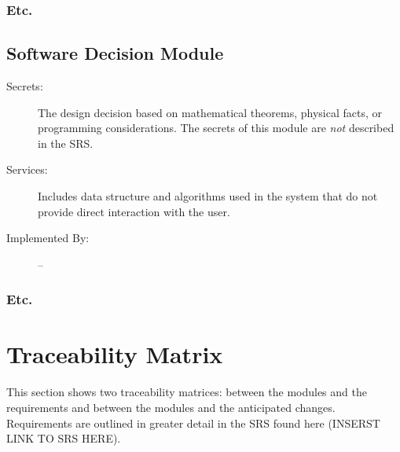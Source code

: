\documentclass[12pt, titlepage]{article}
\begin{document}
\subsubsection{Etc.}


\subsection{Software Decision Module}

\begin{description}
\item[Secrets:] The design decision based on mathematical theorems, physical
  facts, or programming considerations. The secrets of this module are
  \emph{not} described in the SRS.
\item[Services:] Includes data structure and algorithms used in the system that
  do not provide direct interaction with the user. 
\item[Implemented By:] --
\end{description}

\subsubsection{Etc.}

\section{Traceability Matrix} \label{SecTM}

This section shows two traceability matrices: between the modules and the
requirements and between the modules and the anticipated changes. Requirements are outlined in greater detail in the SRS found here (INSERST LINK TO SRS HERE).
\end{document}
